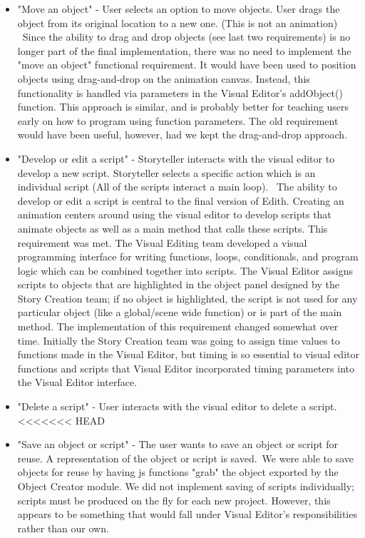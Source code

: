 \documentclass[12pt]{article}
\begin{document}
\begin{itemize}
\item "Move an object" - User selects an option to move objects. User drags the object from its original location to a new one. (This is not an animation)
\ Since the ability to drag and drop objects (see last two requirements) is no longer part of the final implementation, there was no need to implement the "move an object" functional requirement. It would have been used to position objects using drag-and-drop on the animation canvas. Instead, this functionality is handled via parameters in the Visual Editor's addObject() function. This approach is similar, and is probably better for teaching users early on how to program using function parameters. The old requirement would have been useful, however, had we kept the drag-and-drop approach.

\item "Develop or edit a script" - Storyteller interacts with the visual editor to develop a new script. Storyteller selects a specific action which is an individual script (All of the scripts interact a main loop).
\ The ability to develop or edit a script is central to the final version of Edith. Creating an animation centers around using the visual editor to develop scripts that animate objects as well as a main method that calls these scripts. This requirement was met. The Visual Editing team developed a visual programming interface for writing functions, loops, conditionals, and program logic which can be combined together into scripts. The Visual Editor assigns scripts to objects that are highlighted in the object panel designed by the Story Creation team; if no object is highlighted, the script is not used for any particular object (like a global/scene wide function) or is part of the main method. The implementation of this requirement changed somewhat over time. Initially the Story Creation team was going to assign time values to functions made in the Visual Editor, but timing is so essential to visual editor functions and scripts that Visual Editor incorporated timing parameters into the Visual Editor interface.

\item "Delete a script" - User interacts with the visual editor to delete a script.
<<<<<<< HEAD

\item "Save an object or script" - The user wants to save an object or script for reuse. A representation of the object or script is saved.\
We were able to save objects for reuse by having js functions "grab" the object exported by the Object Creator module. We did not implement saving of scripts individually; scripts must be produced on the fly for each new project. However, this appears to be something that would fall under Visual Editor's responsibilities rather than our own.


\end{itemize}
\end{document}
